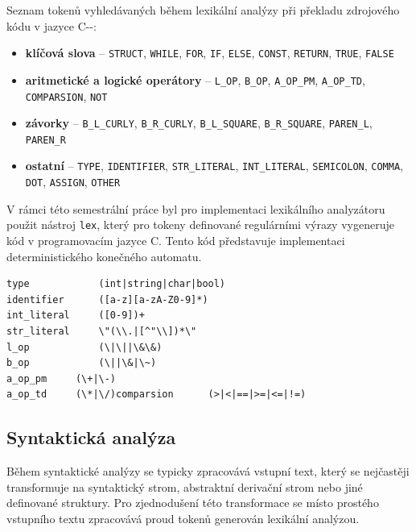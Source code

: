 \documentclass[12pt, a4paper]{article}
\begin{document}
\newpage
Seznam tokenů vyhledávaných během lexikální analýzy při překladu zdrojového kódu v jazyce C-{}-:

\begin{itemize}
    \item \textbf{klíčová slova} -- \texttt{STRUCT}, \texttt{WHILE}, \texttt{FOR}, \texttt{IF}, \texttt{ELSE}, \texttt{CONST}, \texttt{RETURN}, \texttt{TRUE}, \texttt{FALSE}

    \item \textbf{aritmetické a logické operátory} -- \texttt{L\_OP}, \texttt{B\_OP}, \texttt{A\_OP\_PM}, \texttt{A\_OP\_TD}, \texttt{COMPARSION}, \texttt{NOT}
    \item \textbf{závorky} -- \texttt{B\_L\_CURLY}, \texttt{B\_R\_CURLY}, \texttt{B\_L\_SQUARE}, \texttt{B\_R\_SQUARE}, \texttt{PAREN\_L}, \texttt{PAREN\_R}
    \item \textbf{ostatní} -- \texttt{TYPE}, \texttt{IDENTIFIER}, \texttt{STR\_LITERAL}, \texttt{INT\_LITERAL}, \texttt{SEMICOLON}, \texttt{COMMA}, \texttt{DOT}, \texttt{ASSIGN}, \texttt{OTHER}


\end{itemize}

V rámci této semestrální práce byl pro implementaci lexikálního analyzátoru použit nástroj \texttt{lex}, který pro tokeny definované regulárními výrazy vygeneruje kód v programovacím jazyce C. Tento kód představuje implementaci deterministického konečného automatu.

\begin{lstlisting}[caption={Ukázka regulárních výrazů pro skenování tokenů}, captionpos=b, style=flex]
type            (int|string|char|bool)
identifier      ([a-z][a-zA-Z0-9]*)
int_literal     ([0-9])+
str_literal     \"(\\.|[^"\\])*\"
l_op            (\|\||\&\&)
b_op            (\||\&|\~)
a_op_pm     (\+|\-)
a_op_td     (\*|\/)comparsion      (>|<|==|>=|<=|!=)
\end{lstlisting}

\subsection{Syntaktická analýza}

Během syntaktické analýzy se typicky zpracovává vstupní text, který se nejčastěji transformuje na syntaktický strom, abstraktní derivační strom nebo jiné definované struktury. Pro zjednodušení této transformace se místo prostého vstupního textu zpracovává proud tokenů generován lexikální analýzou.
\end{document}
